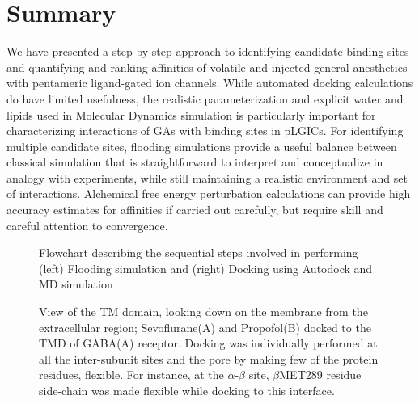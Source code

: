 \documentclass[12pt]{article}
\begin{document}
\section*{Summary}
We have presented a step-by-step approach to identifying candidate binding sites and quantifying and ranking affinities of volatile and injected general anesthetics with pentameric ligand-gated ion channels. While automated docking calculations do have limited usefulness, the realistic parameterization and explicit water and lipids used in Molecular Dynamics simulation is particularly important for characterizing interactions of GAs with binding sites in pLGICs. For identifying multiple candidate sites,  flooding simulations provide a useful balance between classical simulation that is straightforward to interpret and conceptualize in analogy with experiments, while still maintaining a realistic environment and set of interactions.  Alchemical free energy perturbation calculations can provide high accuracy estimates for affinities if carried out carefully, but require skill and careful attention to convergence.  


\clearpage



\begin{figure}
\begin{center}
\centering
\caption{Flowchart describing  the sequential steps involved in performing (left) Flooding simulation and (right) Docking using Autodock and MD simulation}
\label{fig:flowchart_flood}
\end{center}
\end{figure}

\begin{figure}
\begin{center}
\centering
\caption{View of the TM domain, looking down on the membrane from the extracellular region; Sevoflurane(A) and Propofol(B) docked to the TMD of GABA(A) receptor. Docking was individually performed at all the inter-subunit sites and the pore by making few of the protein residues, flexible. For instance, at the $\alpha$-$\beta$ site, $\beta$MET289 residue side-chain was made flexible  while docking to this interface.}
\label{fig:dockPic}
\end{center}
\end{figure}
\end{document}
